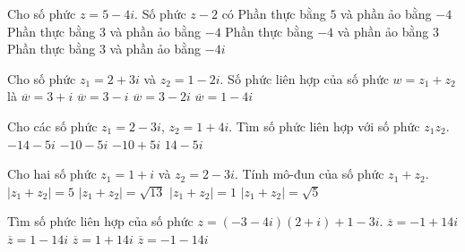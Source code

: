 \begin{ex}%
	Cho số phức $z=5-4i$. Số phức $z-2$ có
	\choice
	{Phần thực bằng $5$ và phần ảo bằng $-4$}
	{\True Phần thực bằng $3$ và phần ảo bằng $-4$}
	{Phần thực bằng $-4$ và phần ảo bằng $3$}
	{Phần thực bằng $3$ và phần ảo bằng $-4i$}
\end{ex}

\begin{ex}%
	Cho số phức $z_1=2+3i$ và $z_2=1-2i$. Số phức liên hợp của số phức $w=z_1+z_2$ là
	\choice
	{$\overline{w}=3+i$}
	{\True $\overline{w}=3-i$}
	{$\overline{w}=3-2i$}
	{$\overline{w}=1-4i$}
\end{ex}

\begin{ex}%
	Cho các số phức $z_1=2-3i$, $z_2=1+4i$. Tìm số phức liên hợp với số phức $z_1z_2$.
	\choice
	{$-14-5i$}
	{$-10-5i$}
	{$-10+5i$}
	{\True $14-5i$}
\end{ex}

\begin{ex}%
	Cho hai số phức $z_1=1+i$ và $z_2=2-3i$. Tính mô-đun của số phức $z_1+z_2$.
	\choice
	{$|z_1+z_2|=5$}
	{\True $|z_1+z_2|=\sqrt{13}$}
	{$|z_1+z_2|=1$}
	{$|z_1+z_2|=\sqrt{5}$}
\end{ex}

\begin{ex}%
	Tìm số phức liên hợp của số phức $z=(-3-4i)(2+i)+1-3i$.
	\choice
	{\True $\overline{z}=-1+14i$}
	{$\overline{z}=1-14i$}
	{$\overline{z}=1+14i$}
	{$\overline{z}=-1-14i$}
\end{ex}

